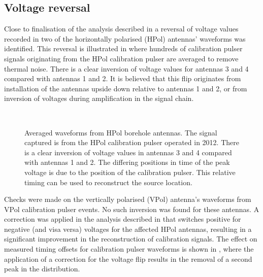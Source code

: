 \subsection{Voltage reversal}
\label{sec:calibration:Voltage-reversal}

Close to finalisation of the analysis described in  a reversal of voltage values recorded in two of the horizontally polarised (HPol) antennas' waveforms was identified. This reversal is illustrated in  where hundreds of calibration pulser signals originating from the HPol calibration pulser are averaged to remove thermal noise. There is a clear inversion of voltage values for antennas 3 and 4 compared with antennas 1 and 2. It is believed that this flip originates from installation of the antennas upside down relative to antennas 1 and 2, or from inversion of voltages during amplification in the signal chain. 

\begin{figure}[htpb]
  \hfill
  \\
  \hfill
\caption{Averaged waveforms from HPol borehole antennas. The signal captured is from the HPol calibration pulser operated in 2012. There is a clear inversion of voltage values in antennas 3 and 4 compared with antennas 1 and 2. The differing positions in time of the peak voltage is due to the position of the calibration pulser. This relative timing can be used to reconstruct the source location.}
\label{fig:calibration:Voltage-Reversal}
\end{figure}


Checks were made on the vertically polarised (VPol) antenna's waveforms from VPol calibration pulser events. No such inversion was found for these antennas. A correction was applied in the analysis described in  that switches positive for negative (and visa versa) voltages for the affected HPol antennas, resulting in a significant improvement in the reconstruction of calibration signals. The effect on measured timing offsets for calibration pulser waveforms is shown in , where the application of a correction for the voltage flip results in the removal of a second peak in the distribution.

